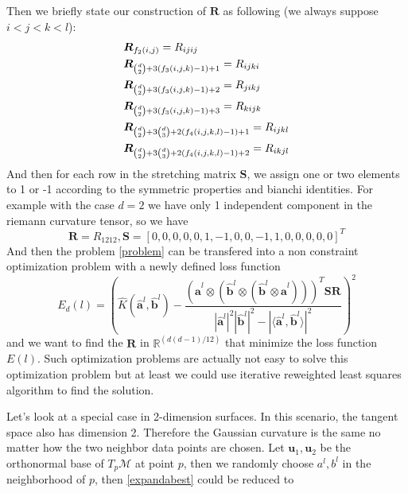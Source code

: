 \documentclass{article}
\begin{document}
Then we briefly state our construction of $\boldsymbol{R}$ as following (we always suppose $i<j<k<l$):
\begin{align}
\notag
&\boldsymbol{R}_{f_2(i,j)}=R_{ijij} \\
\notag
&\boldsymbol{R}_{\binom{d}{2}+3(f_3(i,j,k)-1)+1} = R_{ijki} \\
\notag
&\boldsymbol{R}_{\binom{d}{2}+3(f_3(i,j,k)-1)+2} = R_{jikj} \\
\notag
&\boldsymbol{R}_{\binom{d}{2}+3(f_3(i,j,k)-1)+3} = R_{kijk} \\
\notag
&\boldsymbol{R}_{\binom{d}{2}+3\binom{d}{3}+2(f_4(i,j,k,l)-1)+1} = R_{ijkl}\\
&\boldsymbol{R}_{\binom{d}{2}+3\binom{d}{3}+2(f_4(i,j,k,l)-1)+2} = R_{ikjl}
\end{align}
And then for each row in the stretching matrix $\boldsymbol{S}$, we assign one or two elements to 1 or -1 according to the symmetric properties and bianchi identities. For example with the case $d=2$ we have only 1 independent component in the riemann curvature tensor, so we have 
\begin{equation}
	\boldsymbol{R}=R_{1212},\boldsymbol{S}=[0,0,0,0,0,1,-1,0,0,-1,1,0,0,0,0,0]^T
\end{equation}
And then the problem \ref{problem} can be transfered into a non constraint optimization problem with a newly defined loss function
\begin{equation}
	E_d(l)= \left(\widehat{K}(\widehat{\boldsymbol{a}}^l,\widehat{\boldsymbol{b}}^l)-\frac{(\widehat{\boldsymbol{a}}^l\otimes(\widehat{\boldsymbol{b}}^l\otimes(\widehat{\boldsymbol{b}}^l\otimes\widehat{\boldsymbol{a}}^l)))^T\boldsymbol{S}\boldsymbol{R}}{|\widehat{\boldsymbol{a}}^l|^2|\widehat{\boldsymbol{b}}^l|^2-|\langle \widehat{\boldsymbol{a}}^l,\widehat{\boldsymbol{b}}^l\rangle|^2}\right)^2
	\label{loss2}
\end{equation}
and we want to find the $\boldsymbol{R}$ in $\mathbb{R}^{(d(d-1)/12)}$ that minimize the loss function $E(l)$. Such optimization problems are actually not easy to solve this optimization problem but at least we could use iterative reweighted least squares algorithm to find the solution.
\par
Let's look at a special case in  2-dimension surfaces. In this scenario, the tangent space also has dimension 2. Therefore the Gaussian curvature is the same no matter how the two neighbor data points are chosen. Let $\boldsymbol{u}_1,\boldsymbol{u}_2$ be the orthonormal base of $T_p\mathcal{M}$ at point $p$, then we randomly choose $a^l,b^l$ in the neighborhood of $p$, then \ref{expandabest} could be reduced to 
\end{document}
